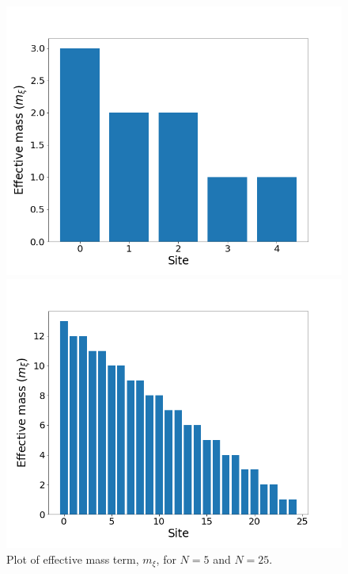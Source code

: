 \begin{figure}[htb]
	\centering
	\begin{minipage}{.5\textwidth}
		\centering
		\includegraphics[scale=0.27]{figures/effectiveMass_xi_N=5.png}
	\end{minipage}%
	\begin{minipage}{0.5\textwidth}
		\centering
		\includegraphics[scale=0.27]{figures/effectiveMass_xi_N=25.png}
	\end{minipage}
	\caption{Plot of effective mass term, $m_\xi$, for $N=5$ and $N=25$.}
	\label{fig:effMassXi}
\end{figure}

